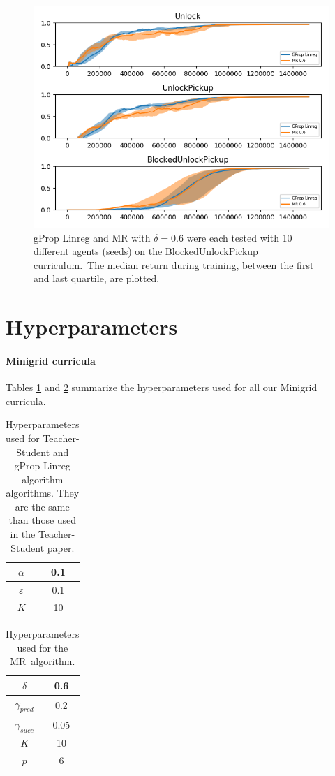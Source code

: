 \documentclass{article}
\begin{document}
\begin{figure}[H]
\centering
\includegraphics[width=0.5\linewidth]{Stats/BUP-Return-MR-base}
\caption{gProp Linreg and MR with \(\delta = 0.6\) were each tested with 10 different agents (seeds) on the BlockedUnlockPickup curriculum.\  The median return during training, between the first and last quartile, are plotted.}
\label{fig:bupmr}
\end{figure}

\section{Hyperparameters}
\label{app:hyperparam}
\paragraph{Minigrid curricula}
Tables \ref{table1} and \ref{table2} summarize the hyperparameters used for all our Minigrid curricula.
\begin{table}[H]
\centering
\begin{tabular}{|c|c|}
   \hline
   $\alpha$ & 0.1 \\
   \hline
   $\varepsilon$ & 0.1 \\
   \hline
   $K$ & 10 \\
   \hline
\end{tabular}
\caption{Hyperparameters used for Teacher-Student and gProp Linreg algorithm algorithms. They are the same than those used in the Teacher-Student paper.}
\label{table1}
\end{table}

\begin{table}[H]
\centering
\begin{tabular}{|c|c|}
   \hline
   $\delta$ & 0.6 \\
   \hline
   $\gamma_{pred}$ & 0.2 \\
   \hline
   $\gamma_{succ}$ & 0.05 \\
   \hline
   $K$ & 10 \\
   \hline
   $p$ & 6 \\
   \hline
\end{tabular}
\caption{Hyperparameters used for the MR\ algorithm. }
\label{table2}
\end{table}
\end{document}
